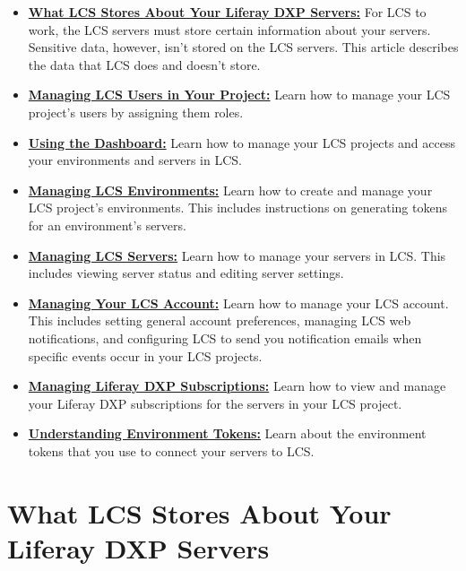 \begin{itemize}
\item
  \href{/docs/7-2/deploy/-/knowledge_base/d/what-lcs-stores-about-your-liferay-dxp-servers}{\textbf{What
  LCS Stores About Your Liferay DXP Servers:}} For LCS to work, the LCS
  servers must store certain information about your servers. Sensitive
  data, however, isn't stored on the LCS servers. This article describes
  the data that LCS does and doesn't store.
\item
  \href{/docs/7-2/deploy/-/knowledge_base/d/managing-lcs-users-in-your-project}{\textbf{Managing
  LCS Users in Your Project:}} Learn how to manage your LCS project's
  users by assigning them roles.
\item
  \href{/docs/7-2/deploy/-/knowledge_base/d/using-the-dashboard}{\textbf{Using
  the Dashboard:}} Learn how to manage your LCS projects and access your
  environments and servers in LCS.
\item
  \href{/docs/7-2/deploy/-/knowledge_base/d/managing-lcs-environments}{\textbf{Managing
  LCS Environments:}} Learn how to create and manage your LCS project's
  environments. This includes instructions on generating tokens for an
  environment's servers.
\item
  \href{/docs/7-2/deploy/-/knowledge_base/d/managing-lcs-servers}{\textbf{Managing
  LCS Servers:}} Learn how to manage your servers in LCS. This includes
  viewing server status and editing server settings.
\item
  \href{/docs/7-2/deploy/-/knowledge_base/d/managing-your-lcs-account}{\textbf{Managing
  Your LCS Account:}} Learn how to manage your LCS account. This
  includes setting general account preferences, managing LCS web
  notifications, and configuring LCS to send you notification emails
  when specific events occur in your LCS projects.
\item
  \href{/docs/7-2/deploy/-/knowledge_base/d/managing-liferay-dxp-subscriptions}{\textbf{Managing
  Liferay DXP Subscriptions:}} Learn how to view and manage your Liferay
  DXP subscriptions for the servers in your LCS project.
\item
  \href{/docs/7-2/deploy/-/knowledge_base/d/understanding-environment-tokens}{\textbf{Understanding
  Environment Tokens:}} Learn about the environment tokens that you use
  to connect your servers to LCS.
\end{itemize}

\chapter{What LCS Stores About Your Liferay DXP
Servers}\label{what-lcs-stores-about-your-liferay-dxp-servers}

